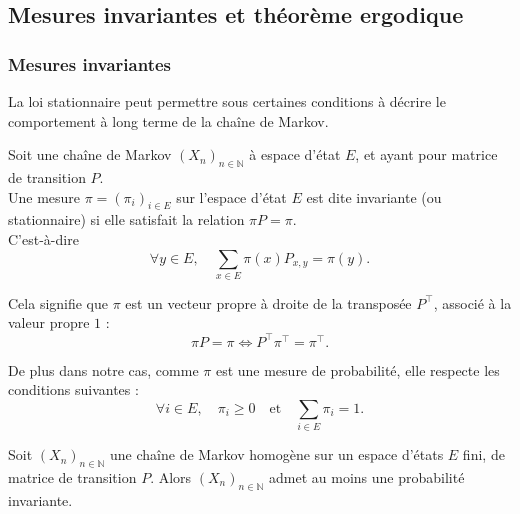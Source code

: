 \documentclass{article}
\begin{document}

\newpage
\subsection{Mesures invariantes et théorème ergodique}

\subsubsection{Mesures invariantes}

La loi stationnaire peut permettre sous certaines conditions à décrire le comportement à long terme de la chaîne de Markov. \\ %

\begin{tcolorbox}[colback=white,colframe=red!80!black,title=Mesure invariante/stationnaire]
Soit une chaîne de Markov $(X_n)_{n \in \mathbb{N}}$ à espace d'état $E$, et ayant pour matrice de transition $P$. \\

Une mesure $\pi = (\pi_i)_{i \in E}$ sur l'espace d'état $E$ est dite invariante (ou stationnaire) si elle satisfait la relation $\pi P = \pi$. \\

C'est-à-dire
\[
\forall y \in E, \quad \sum_{x \in E} \pi(x) P_{x, y} = \pi(y).
\]
\end{tcolorbox}

Cela signifie que $\pi$ est un vecteur propre à droite de la transposée $P^{\top}$, associé à la valeur propre $1$ :
\[
\pi P = \pi \iff P^{\top} \pi^{\top} = \pi^{\top}.
\]

De plus dans notre cas, comme $\pi$ est une mesure de probabilité, elle respecte les conditions suivantes :
\[
\forall i \in E, \quad \pi_i \geq 0 \quad \text{et} \quad \sum_{i \in E} \pi_i = 1.
\]

\begin{tcolorbox}[colback=white,colframe=blue!80!black,title=Existence d'une probabilité invariante]
Soit $(X_n)_{n \in \mathbb{N}}$ une chaîne de Markov homogène sur un espace d'états $E$ fini, de matrice de transition $P$. Alors $(X_n)_{n \in \mathbb{N}}$ admet au moins une probabilité invariante.
\end{tcolorbox}
\end{document}
